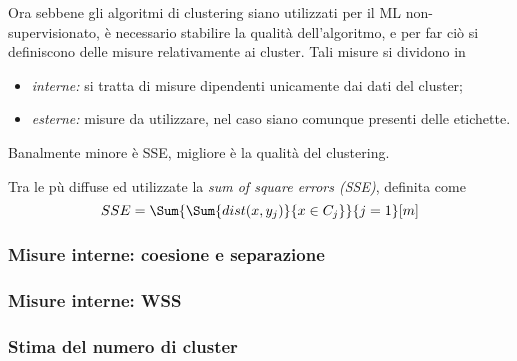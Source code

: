 \documentclass{subfiles}
\begin{document}
Ora sebbene gli algoritmi di clustering siano utilizzati per il ML non-supervisionato, è necessario stabilire la qualità dell'algoritmo,
e per far ciò si definiscono delle misure relativamente ai cluster. Tali misure si dividono in
\begin{itemize}
    \item \emph{interne:} si tratta di misure dipendenti unicamente dai dati del cluster;
    \item \emph{esterne:} misure da utilizzare, nel caso siano comunque presenti delle etichette.
\end{itemize}
\begin{MarginNote}
    Banalmente minore è SSE, migliore è la qualità del clustering.
\end{MarginNote}
Tra le pù diffuse ed utilizzate la \emph{sum of square errors (SSE)}, definita come
$$
    SSE = \Sum{\Sum{dist(x, y_{j})}{x \in C_{j}}}{j = 1}[m]
$$

\subsubsection{Misure interne: coesione e separazione}


\subsubsection{Misure interne: WSS}


\subsubsection{Stima del numero di cluster}

\end{document}
